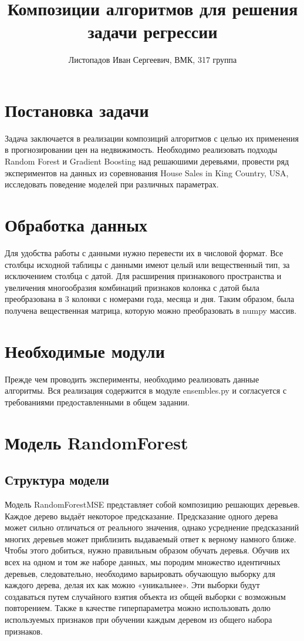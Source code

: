 \documentclass[a4paper,14pt]{article}
\title{\textbf{Композиции алгоритмов для решения задачи регрессии}}
\author{Листопадов Иван Сергеевич, ВМК, 317 группа}
\begin{document}
\begin{titlingpage}
        \maketitle
    \end{titlingpage}
    
\newpage
    \tableofcontents{}
\newpage


\section{Постановка задачи}
Задача заключается в реализации композиций алгоритмов с целью их применения в прогнозировании цен на недвижимость. Необходимо реализовать подходы Random Forest и Gradient Boosting над решаюшими деревьями, провести ряд экспериментов на данных из соревнования House Sales in King Country, USA, исследовать поведение моделей при различных параметрах.

\section{Обработка данных}
Для удобства работы с данными нужно перевести их в числовой формат. Все столбцы исходной таблицы с данными имеют целый или вещественный тип, за исключением столбца с датой. Для расширения признакового пространства и увеличения многообразия комбинаций признаков колонка с датой была преобразована в 3 колонки с номерами года, месяца и дня. Таким образом, была получена вещественная матрица, которую можно преобразовать в numpy массив.


\section{Необходимые модули}
Прежде чем проводить эксперименты, необходимо реализовать данные алгоритмы. Вся реализация содержится в модуле {ensembles.py} и согласуется с требованиями предоставленными в общем задании.

\section{Модель RandomForest}
\subsection{Структура модели}
Модель RandomForestMSE представляет собой композицию решающих деревьев. Каждое дерево выдаёт некоторое предсказание. Предсказание одного дерева может сильно отличаться от реального значения, однако усреднение предсказаний многих деревьев может приблизить выдаваемый ответ к верному намного ближе. Чтобы этого добиться, нужно правильным образом обучать деревья. Обучив их всех на одном и том же наборе данных, мы породим множество идентичных деревьев, следовательно, необходимо варьировать обучающую выборку для каждого дерева, делая их как можно «уникальнее». Эти выборки будут создаваться путем случайного взятия объекта из общей выборки с возможным повторением. Также в качестве гиперпараметра можно использовать долю используемых признаков при обучении каждым деревом из общего набора признаков.
\end{document}
